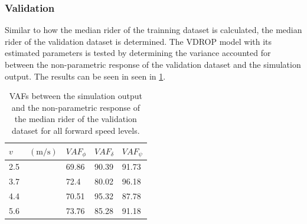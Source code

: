 \subsubsection{Validation}
Similar to how the median rider of the trainning dataset is calculated, the median rider of the validation dataset is determined. The VDROP model with its estimated parameters is tested by determining the variance accounted for between the non-parametric response of the  validation dataset and the simulation output. The results can be seen in seen in \cref{tb:validation}.
\begin{table}[!h]
  
    \centering
    \caption{VAFs between the simulation output and the non-parametric response of the median rider of the validation dataset for all forward speed levels.}
    \begin{tabular}{l|lll}
        \label{tb:validation}
    $v\;\;\;\;\;\;\; (\si{\meter\per\second})$ & $\mathit{VAF}_\phi$ & $\mathit{VAF}_\delta$ & $\mathit{VAF}_\psi$ \\ \hline
    2.5                        & 69.86               & 90.39                 & 91.73               \\
    3.7                        & 72.4               & 80.02                 & 96.18               \\
    4.4                        & 70.51              & 95.32                 & 87.78               \\
    5.6                        & 73.76              & 85.28                 & 91.18              
    \end{tabular}
    \end{table}

